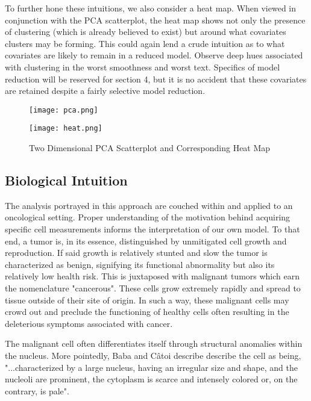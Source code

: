 \documentclass[10pt]{article}
\begin{document}
	To further hone these intuitions, we also consider a heat map.  When viewed in conjunction with the PCA scatterplot, the heat map shows not only the presence of clustering (which is already believed to exist) but around what covariates clusters may be forming.  This could again lend a crude intuition as to what covariates are likely to remain in a reduced model.   Observe deep hues associated with clustering in the worst smoothness and worst text.  Specifics of model reduction will be reserved for section 4, but it is no accident that these covariates are retained despite a fairly selective model reduction.  
	
	
\begin{figure}[htbp]
\centering
\begin{minipage}{.5\textwidth}
	\centering
	\texttt{[image: pca.png]}
\end{minipage}%
\begin{minipage}{.5\textwidth}
	\centering
	\texttt{[image: heat.png]}
\end{minipage}%
\caption{Two Dimensional PCA Scatterplot and Corresponding Heat Map}\label{fig:heat}
\end{figure}

\subsection{Biological Intuition}

	The analysis portrayed in this approach are couched within and applied to an oncological setting.   Proper understanding of the motivation behind acquiring specific cell measurements informs the interpretation of our own model.  To that end, a tumor is, in its essence, distinguished by unmitigated cell growth and reproduction.  If said growth is relatively stunted and slow the tumor is characterized as benign, signifying its functional abnormality but also its relatively low health risk.  This is juxtaposed with malignant tumors which earn the nomenclature "cancerous".  These cells grow extremely rapidly and spread to tissue outside of their site of origin.  In such a way, these malignant cells may crowd out and preclude the functioning of healthy cells often resulting in the deleterious symptoms associated with cancer.   
	
	The malignant cell often differentiates itself through structural anomalies within the nucleus.  More pointedly, Baba and  Câtoi describe describe the cell as being, "...characterized by a large nucleus, having an irregular size and shape, and the nucleoli are prominent, the cytoplasm is scarce and intensely colored or, on the contrary, is pale".  
	
\end{document}
